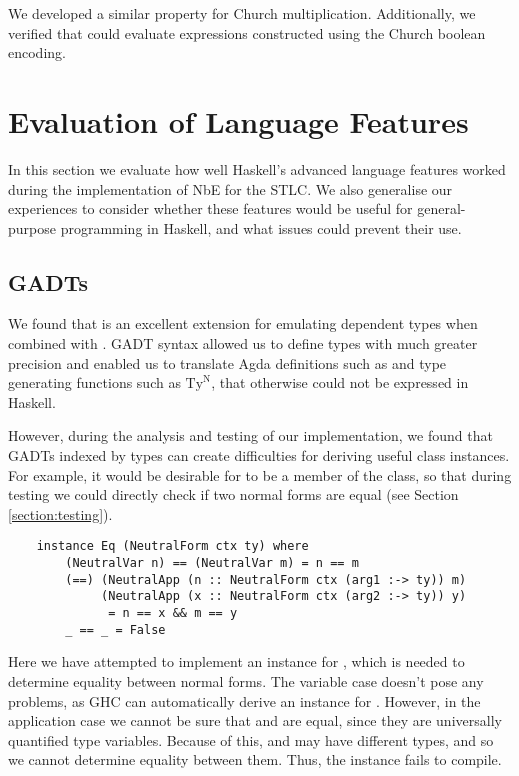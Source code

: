 We developed a similar property for Church multiplication. Additionally, we verified that  could evaluate expressions constructed using the Church boolean encoding.

\section{Evaluation of Language Features}

In this section we evaluate how well Haskell's advanced language features worked during the implementation of NbE for the STLC. We also generalise our experiences to consider whether these features would be useful for general-purpose programming in Haskell, and what issues could prevent their use.

\subsection{GADTs}
\label{subsect:GADTanalysis}

We found that  is an excellent extension for emulating dependent types when combined with . GADT syntax allowed us to define types  with much greater precision and enabled us to translate Agda  definitions such as  and type generating functions such as $\text{Ty}^\text{N}$, that otherwise could not be expressed in Haskell.

However, during the analysis and testing of our implementation, we found that GADTs indexed by types can create difficulties for deriving useful class instances. For example, it would be desirable for  to be a member of the  class, so that during testing we could directly check if two normal forms are equal (see Section \ref{section:testing}). 

\begin{lstlisting}
    instance Eq (NeutralForm ctx ty) where
        (NeutralVar n) == (NeutralVar m) = n == m
        (==) (NeutralApp (n :: NeutralForm ctx (arg1 :-> ty)) m) 
             (NeutralApp (x :: NeutralForm ctx (arg2 :-> ty)) y) 
              = n == x && m == y 
        _ == _ = False
\end{lstlisting}

Here we have attempted to implement an  instance for , which is needed to determine equality between normal forms. The variable case doesn't pose any problems, as GHC can automatically derive an  instance for . However, in the application case we cannot be sure that  and  are equal, since they are universally quantified type variables. Because of this,  and  may have different types, and so we cannot determine equality between them. Thus, the instance fails to compile.

